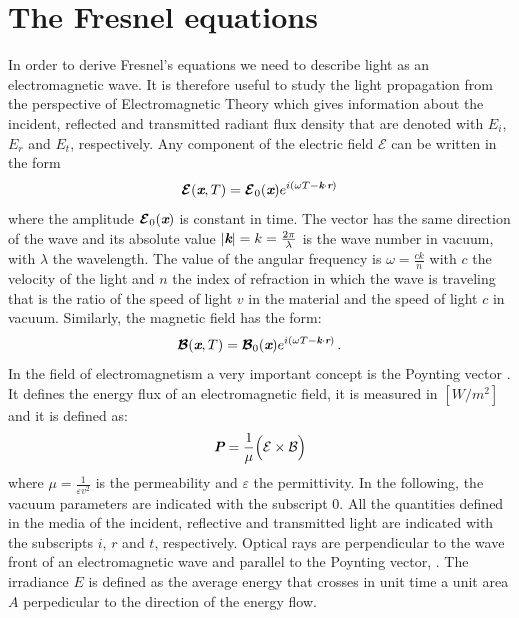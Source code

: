 \section{The Fresnel equations}
In order to derive Fresnel's equations we need to describe light as an electromagnetic wave. 
It is therefore useful to study the light propagation from the perspective of Electromagnetic Theory which gives information about the incident, reflected and transmitted radiant flux density that are denoted with $E_i$, $E_r$ and $E_t$, respectively.  
Any component of the electric field $\boldsymbol{\mathcal{E}}$ can be written in the form
\begin{equation}
\boldsymbol{\mathcal{E}}(\textit{\textbf{x}}, T) = \boldsymbol{\mathcal{E}}_0(\textit{\textbf{x}} )e^{i(\omega T - \textit{\textbf{k}}\cdot \textit{\textbf{r}})}
\end{equation}
where the amplitude $\boldsymbol{\mathcal{E}}_0(\textit{\textbf{x}})$ is constant in time. The vector  has the same direction of the wave and its absolute value 
$|\textit{\textbf{k}}| = k = \frac{2\pi}{\lambda}$ is the wave number in vacuum, with $\lambda$ the wavelength. The value of the angular frequency is $\omega = \frac{c k}{n}$ with $c$ the velocity of the light and $n$ the index of refraction in which the wave is traveling that is the ratio of the speed of light $v$ in the material and the speed of light $c$ in vacuum.
Similarly, the magnetic field has the form:
\begin{equation}
\boldsymbol{\mathcal{B}}(\textit{\textbf{x}}, T) = \boldsymbol{\mathcal{B}}_0(\textit{\textbf{x}}) e^{i(\omega T - \textit{\textbf{k}}\cdot \textit{\textbf{r}})}\,.
\end{equation}
In the field of electromagnetism a very important concept is the Poynting vector . 
It defines the energy flux of an electromagnetic field,  it is measured in $[W/m^2]$ and it is defined as:
\begin{equation}
\textit{\textbf{P}} = \frac{1}{\mu}\Big(\mathcal{E}\times \mathcal{B}\Big)
\end{equation}
where $\mu = \frac{1}{\varepsilon v^2}$ is the permeability and $\varepsilon$ the permittivity. In the following, the vacuum parameters are indicated with the subscript $0$. All the quantities defined in the media of the incident, reflective and transmitted light are indicated with the subscripts $i$, $r$ and $t$, respectively. Optical rays are perpendicular to the wave front of an electromagnetic wave and parallel to the Poynting vector, \cite{jones2015optical}.
The irradiance $E$ is defined as the average energy that crosses in unit time a unit area $A$ perpedicular to the direction of the energy flow.
